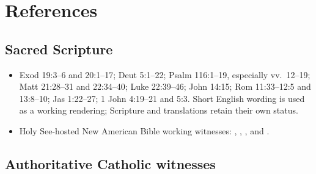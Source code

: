 \section{References}

\begingroup
\sloppy

\subsection*{Sacred Scripture}

{\fontsize{8.6}{9.6}\selectfont
\begin{itemize}[itemsep=0pt,parsep=0pt,topsep=0.05em]
\item Exod 19:3--6 and 20:1--17; Deut 5:1--22; Psalm 116:1--19, especially vv.~12--19; Matt 21:28--31 and 22:34--40; Luke 22:39--46; John 14:15; Rom 11:33--12:5 and 13:8--10; Jas 1:22--27; 1 John 4:19--21 and 5:3. Short English wording is used as a working rendering; Scripture and translations retain their own status.
\item Holy See-hosted New American Bible working witnesses: , , , and .
\end{itemize}}

\subsection*{Authoritative Catholic witnesses}

